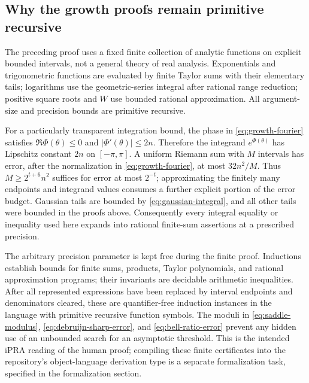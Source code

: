 \subsection{Why the growth proofs remain primitive recursive}

The preceding proof uses a fixed finite collection of analytic
functions on explicit bounded intervals, not a general theory of
real analysis.  Exponentials and trigonometric functions are evaluated
by finite Taylor sums with their elementary tails; logarithms use
the geometric-series integral after rational range reduction;
positive square roots and $W$ use bounded rational approximation.
All argument-size and precision bounds are primitive recursive.

For a particularly transparent integration bound, the phase in
\eqref{eq:growth-fourier} satisfies
$\Re\Phi(\theta)\leq0$ and $|\Phi'(\theta)|\leq2n$.
Therefore the integrand $e^{\Phi(\theta)}$ has Lipschitz constant
$2n$ on $[-\pi,\pi]$.  A uniform Riemann sum with $M$ intervals
has error, after the normalization in
\eqref{eq:growth-fourier}, at most $32n^2/M$.  Thus
$M\geq2^{t+6}n^2$ suffices for error at most $2^{-t}$; approximating
the finitely many endpoints and integrand values consumes a further
explicit portion of the error budget.  Gaussian tails are bounded by
\eqref{eq:gaussian-integral}, and all other tails were bounded in
the proofs above.  Consequently every integral equality or
inequality used here expands into rational finite-sum assertions at
a prescribed precision.

The arbitrary precision parameter is kept free during the finite
proof.  Inductions establish bounds for finite sums, products,
Taylor polynomials, and rational approximation programs; their
invariants are decidable arithmetic inequalities.  After all
represented expressions have been replaced by interval endpoints
and denominators cleared, these are quantifier-free induction
instances in the language with primitive recursive function
symbols.  The moduli in \eqref{eq:saddle-modulus},
\eqref{eq:debruijn-sharp-error}, and
\eqref{eq:bell-ratio-error} prevent any hidden use of an unbounded
search for an asymptotic threshold.  This is the intended iPRA
reading of the human proof; compiling these finite certificates
into the repository's object-language derivation type is a
separate formalization task, specified in the formalization section.

